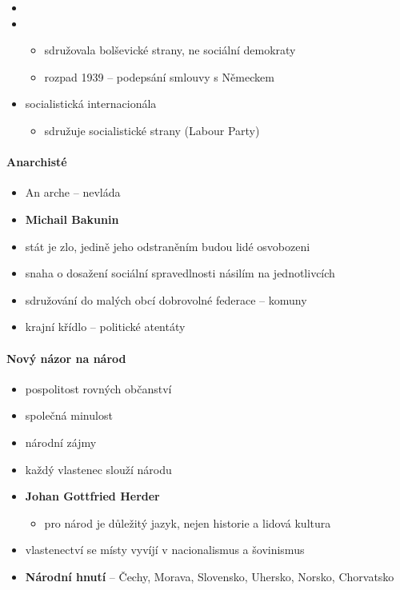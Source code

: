 \begin{itemize}
\begin{itemize}
	\item {}
	\item {}
		\begin{itemize}
		\item sdružovala bolševické strany, ne sociální demokraty
		\item rozpad 1939 -- podepsání smlouvy s Německem
		\end{itemize}
	\item socialistická internacionála
		\begin{itemize}
		\item sdružuje socialistické strany (Labour Party)
		\end{itemize}
	\end{itemize}
\end{itemize}

\paragraph{Anarchisté}
\begin{itemize}
\item An arche -- nevláda
\item \textbf{Michail Bakunin}
\item stát je zlo, jedině jeho odstraněním budou lidé osvobozeni
\item snaha o dosažení sociální spravedlnosti násilím na jednotlivcích
\item sdružování do malých obcí dobrovolné federace -- komuny
\item krajní křídlo -- politické atentáty
\end{itemize}

\paragraph{Nový názor na národ}
\begin{itemize}
\item pospolitost rovných občanství
\item společná minulost
\item národní zájmy
\item každý vlastenec slouží národu
\item \textbf{Johan Gottfried Herder}
	\begin{itemize}
	\item pro národ je důležitý jazyk, nejen historie a lidová kultura
	\end{itemize}
\item vlastenectví se místy vyvíjí v nacionalismus a šovinismus
\item \textbf{Národní hnutí} -- Čechy, Morava, Slovensko, Uhersko, Norsko, Chorvatsko
\end{itemize}

